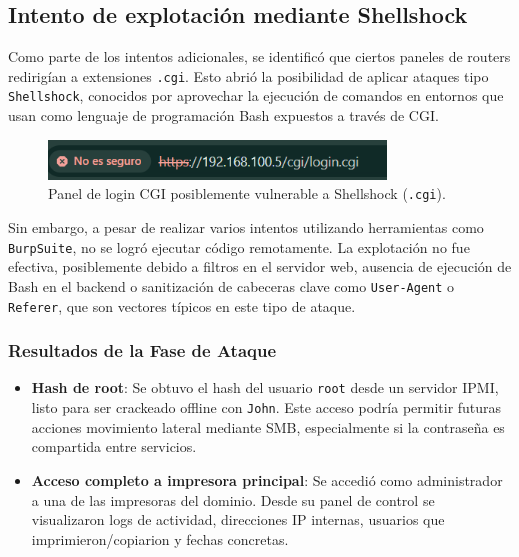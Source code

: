 \documentclass[a4paper, 11pt]{article}
\begin{document}
\subsection*{Intento de explotación mediante Shellshock}

Como parte de los intentos adicionales, se identificó que ciertos paneles de routers redirigían a extensiones \texttt{.cgi}. Esto abrió la posibilidad de aplicar ataques tipo \texttt{Shellshock}, conocidos por aprovechar la ejecución de comandos en entornos que usan como lenguaje de programación Bash expuestos a través de CGI.

\begin{figure}[H]
    \centering
    \includegraphics[width=0.8\textwidth]{images/logincgi.png}
    \caption{Panel de login CGI posiblemente vulnerable a Shellshock (\texttt{.cgi}).}
    \label{fig:ipv6_poisoning}
\end{figure}


Sin embargo, a pesar de realizar varios intentos utilizando herramientas como \texttt{BurpSuite}, no se logró ejecutar código remotamente. La explotación no fue efectiva, posiblemente debido a filtros en el servidor web, ausencia de ejecución de Bash en el backend o sanitización de cabeceras clave como \texttt{User-Agent} o \texttt{Referer}, que son vectores típicos en este tipo de ataque.



\subsubsection*{Resultados de la Fase de Ataque}

\begin{itemize}
    \item \textbf{Hash de root}: Se obtuvo el hash del usuario \texttt{root} desde un servidor IPMI, listo para ser crackeado offline con \texttt{John}. Este acceso podría permitir futuras acciones movimiento lateral mediante SMB, especialmente si la contraseña es compartida entre servicios.
    
    \item \textbf{Acceso completo a impresora principal}: Se accedió como administrador a una de las impresoras del dominio. Desde su panel de control se visualizaron logs de actividad, direcciones IP internas, usuarios que imprimieron/copiarion y fechas concretas.
\end{itemize}
\end{document}
